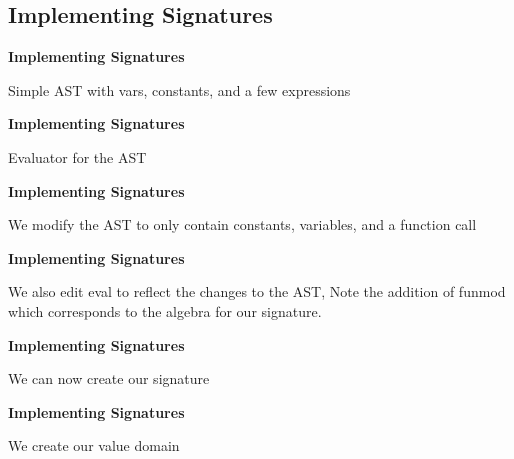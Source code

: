 \subsection*{Implementing Signatures}
\begin{frame}[fragile]{\textbf{Implementing Signatures}}
    \begin{example}
        Simple AST with vars, constants, and a few expressions
        
    \end{example}
\end{frame}
\begin{frame}[fragile]{\textbf{Implementing Signatures}}
    \begin{example}
        Evaluator for the AST
        
    \end{example}
\end{frame}

\begin{frame}[fragile]{\textbf{Implementing Signatures}}
    \begin{example}
        We modify the AST to only contain constants, variables, and a function call 
        
    \end{example}
\end{frame}

\begin{frame}[fragile]{\textbf{Implementing Signatures}}
    \begin{example}
        We also edit eval to reflect the changes to the AST, Note the addition of funmod which corresponds to the algebra for our signature.
        
    \end{example}
\end{frame}

\begin{frame}[fragile]{\textbf{Implementing Signatures}}
    \begin{example}
        We can now create our signature
        
    \end{example}
\end{frame}

\begin{frame}[fragile]{\textbf{Implementing Signatures}}
    \begin{example}
        We create our value domain
        
    \end{example}
\end{frame}


